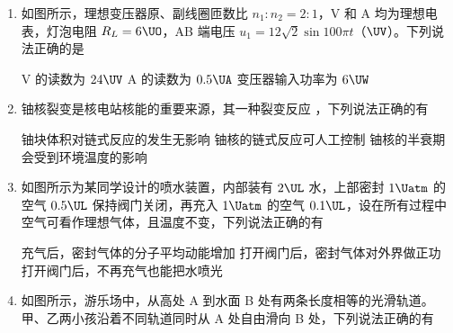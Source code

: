 \documentclass[\gkver]{gaokaozhenti}
\begin{document}
\begin{enumerate}
\item
如图所示，理想变压器原、副线圈匝数比 $n_{1}:n_{2}=2:1$，V 和 A 均为理想电表，灯泡电阻 $R_{L}=6\UO$，AB 端电压 $u_{1}=12\sqrt{2}\sin100\pi t$（$\UV$）。下列说法正确的是


{V 的读数为 $24\UV$}
{A 的读数为 $0.5\UA$}
{变压器输入功率为 $6\UW$}


\item
铀核裂变是核电站核能的重要来源，其一种裂变反应 ，下列说法正确的有

{铀块体积对链式反应的发生无影响}
{铀核的链式反应可人工控制}
{铀核的半衰期会受到环境温度的影响}


\item
如图所示为某同学设计的喷水装置，内部装有 $2\UL$ 水，上部密封 $1\Uatm$ 的空气 $0.5\UL$ 保持阀门关闭，再充入 $1\Uatm$ 的空气 $0.1\UL$，设在所有过程中空气可看作理想气体，且温度不变，下列说法正确的有


{充气后，密封气体的分子平均动能增加}
{打开阀门后，密封气体对外界做正功}
{打开阀门后，不再充气也能把水喷光}


\item
如图所示，游乐场中，从高处 A 到水面 B 处有两条长度相等的光滑轨道。甲、乙两小孩沿着不同轨道同时从 A 处自由滑向 B 处，下列说法正确的有


\end{enumerate}
\end{document}
